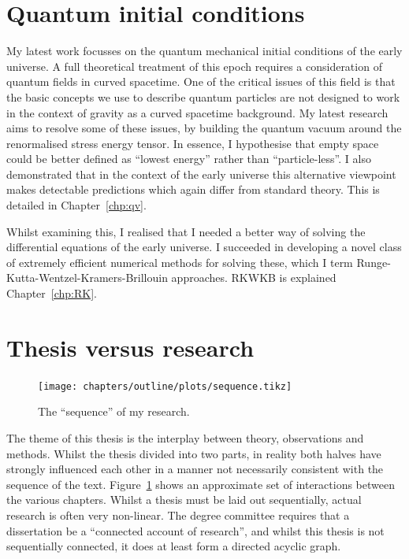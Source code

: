 \section{Quantum initial conditions}
My latest work focusses on the quantum mechanical initial conditions of the early universe. A full theoretical treatment of this epoch requires a consideration of quantum fields in curved spacetime. One of the critical issues of this field is that the basic concepts we use to describe quantum particles are not designed to work in the context of gravity as a curved spacetime background. My latest research aims to resolve some of these issues, by building the quantum vacuum around the renormalised stress energy tensor. In essence, I hypothesise that empty space could be better defined as ``lowest energy'' rather than ``particle-less''. I also demonstrated that in the context of the early universe this alternative viewpoint makes detectable predictions which again differ from standard theory. This is detailed in Chapter~\ref{chp:qv}.

Whilst examining this, I realised that I needed a better way of solving the differential equations of the early universe. I succeeded in developing a novel class of extremely efficient numerical methods for solving these, which I term Runge-Kutta-Wentzel-Kramers-Brillouin approaches. RKWKB is explained Chapter~\ref{chp:RK}.

\section{Thesis versus research}
\begin{figure}[tp]
  \centering
  \texttt{[image: chapters/outline/plots/sequence.tikz]}
  \caption{The ``sequence'' of my research.}\label{fig:out:sequence}
\end{figure}

The theme of this thesis is the interplay between theory, observations and methods. Whilst the thesis divided into two parts, in reality both halves have strongly influenced each other in a manner not necessarily consistent with the sequence of the text. Figure~\ref{fig:out:sequence} shows an approximate set of interactions between the various chapters. Whilst a thesis must be laid out sequentially, actual research is often very non-linear. The degree committee requires that a dissertation be a ``connected account of research'', and whilst this thesis is not sequentially connected, it does at least form a directed acyclic graph.
